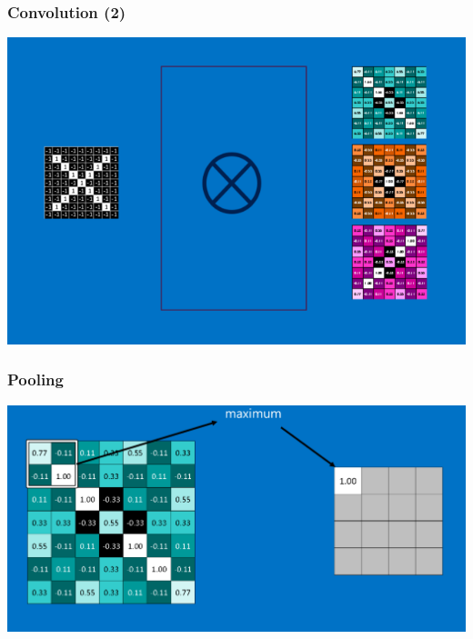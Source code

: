 \documentclass[11pt]{article}
\begin{document}
\subsubsection*{Convolution (2)}
\label{sec:org06b67b1}
\begin{center}
\begin{center}
\includegraphics[width=.9\linewidth]{images/convolution_3.png}
\end{center}
\end{center}
\subsubsection*{Pooling}
\label{sec:org62a2a9f}
\begin{center}
\begin{center}
\includegraphics[width=.9\linewidth]{images/pooling.png}
\end{center}
\end{center}
\end{document}
